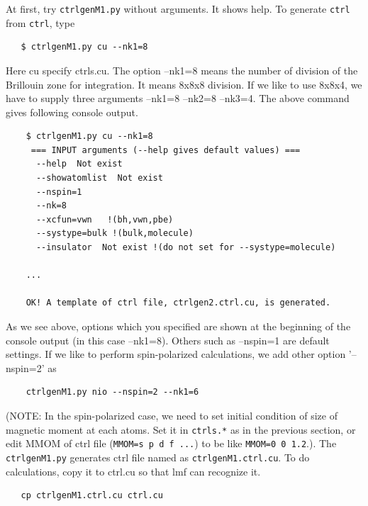At first, try \verb+ctrlgenM1.py+ without arguments. It shows help. 
To generate \verb+ctrl+ from \verb+ctrl+, type
\begin{verbatim}
   $ ctrlgenM1.py cu --nk1=8
\end{verbatim}
Here cu specify ctrls.cu. The option --nk1=8 
means the number of division of the Brillouin zone for
integration. It means 8x8x8 division. If we like to use 8x8x4, 
we have to supply three arguments --nk1=8 --nk2=8 --nk3=4.
The above command gives following console output.
\begin{verbatim}
    $ ctrlgenM1.py cu --nk1=8
     === INPUT arguments (--help gives default values) === 
      --help  Not exist
      --showatomlist  Not exist
      --nspin=1
      --nk=8
      --xcfun=vwn   !(bh,vwn,pbe) 
      --systype=bulk !(bulk,molecule)
      --insulator  Not exist !(do not set for --systype=molecule)

    ...

    OK! A template of ctrl file, ctrlgen2.ctrl.cu, is generated.
\end{verbatim}
As we see above, 
options which you specified are shown at the beginning of the console output
(in this case --nk1=8). Others such as --nspin=1 are default settings.
If we like to perform spin-polarized calculations, we add other option
'--nspin=2' as
\begin{verbatim}
    ctrlgenM1.py nio --nspin=2 --nk1=6
\end{verbatim}
(NOTE: In the spin-polarized case, we need to set initial condition of size of
magnetic moment at each atoms. Set it in \verb+ctrls.*+ as in the
previous section, or edit MMOM of ctrl file (\verb+MMOM=s p d f ...+) to be like
\verb+MMOM=0 0 1.2+.). The \verb+ctrlgenM1.py+ generates ctrl file named as
\verb+ctrlgenM1.ctrl.cu+. To do calculations, copy it to ctrl.cu so 
that lmf can recognize it.
\begin{verbatim}
   cp ctrlgenM1.ctrl.cu ctrl.cu
\end{verbatim}


